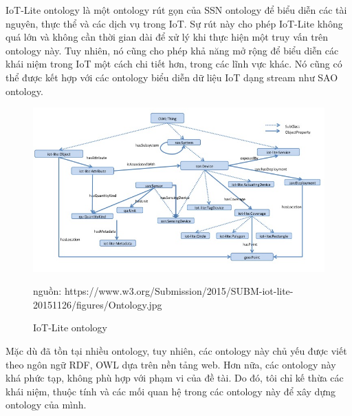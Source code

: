 IoT-Lite ontology là một ontology rút gọn của SSN ontology để biểu diễn các tài nguyên, thực thể và các dịch vụ trong IoT. Sự rút này cho phép IoT-Lite không quá lớn và không cần thời gian dài để xử lý khi thực hiện một truy vấn trên ontology này. Tuy nhiên, nó cũng cho phép khả năng mở rộng để biểu diễn các khái niệm trong IoT một cách chi tiết hơn, trong các lĩnh vực khác. Nó cũng có thể được kết hợp với các ontology biểu diễn dữ liệu IoT dạng stream như SAO ontology. 
\clearpage

\begin{figure}[h!]
	\center
	\includegraphics[scale=0.6]{image/iot-lite} \\
	\caption{IoT-Lite ontology}
	nguồn: https://www.w3.org/Submission/2015/SUBM-iot-lite-20151126/figures/Ontology.jpg
\end{figure}


Mặc dù đã tồn tại nhiều ontology, tuy nhiên, các ontology này chủ yếu được viết theo ngôn ngữ RDF, OWL dựa trên nền tảng web. Hơn nữa, các ontology này khá phức tạp, không phù hợp với phạm vi của đề tài. Do đó, tôi chỉ kế thừa các khái niệm, thuộc tính và các mối quan hệ trong các ontology này để xây dựng ontology của mình.

